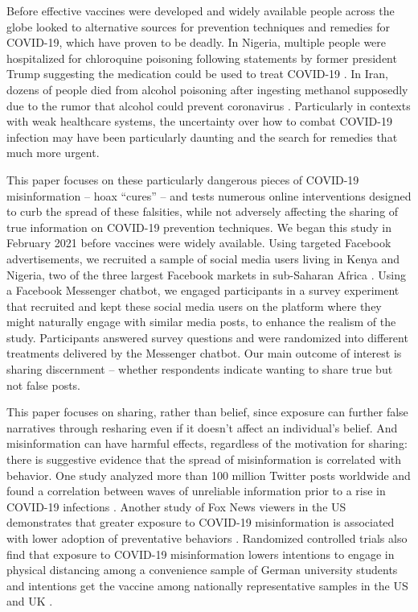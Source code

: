 \documentclass[letterpaper, 12pt, parskip=full,DIV=10]{scrartcl}
\begin{document}
Before effective vaccines were developed and widely available people across the globe looked to alternative sources for prevention techniques and remedies for COVID-19, which have proven to be deadly. In Nigeria, multiple people were hospitalized for chloroquine poisoning following statements by former president Trump suggesting the medication could be used to treat COVID-19 \citep{busari2020nigeria}. In Iran, dozens of people died from alcohol poisoning after ingesting methanol supposedly due to the rumor that alcohol could prevent coronavirus \citep{haghdoost2020alcohol}. Particularly in contexts with weak healthcare systems, the uncertainty over how to combat COVID-19 infection may have been particularly daunting and the search for remedies that much more urgent. %


This paper focuses on these particularly dangerous pieces of COVID-19 misinformation -- hoax ``cures'' -- and tests numerous online interventions designed to curb the spread of these falsities, while not adversely affecting the sharing of true information on COVID-19 prevention techniques.  We began this study in February 2021 before vaccines were widely available. Using targeted Facebook advertisements, we recruited a sample of social media users living in Kenya and Nigeria, two of the three largest Facebook markets in sub-Saharan Africa \citep{world-population-reviewfacebook}. Using a Facebook Messenger chatbot,  we engaged participants in a survey experiment that recruited and kept these social media users on the platform where they might naturally engage with similar media posts, to enhance the realism of the study.  Participants answered survey questions and were randomized into different treatments delivered by the Messenger chatbot. Our main outcome of interest is sharing discernment -- whether respondents indicate wanting to share true but not false posts. 


This paper focuses on sharing, rather than belief, since exposure can further false narratives through resharing even if it doesn't affect an individual's belief. And misinformation can have harmful effects, regardless of the motivation for sharing: there is suggestive evidence that the spread of misinformation is correlated with behavior. One study analyzed more than 100 million Twitter posts worldwide and found a correlation between waves of unreliable information prior to a rise in COVID-19 infections \citep{gallotti2020assessing}. Another study of Fox News viewers in the US demonstrates that greater exposure to COVID-19 misinformation is associated with lower adoption of preventative behaviors \citep{bursztyn2022opinions}. Randomized controlled trials also find that exposure to COVID-19 misinformation lowers intentions to engage in physical distancing among a convenience sample of German university students \citep{pummerer2022conspiracy} and intentions get the vaccine among nationally representative samples in the US and UK \citep{loomba2021measuring}.
\end{document}
